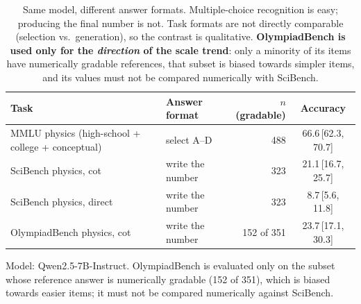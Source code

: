 \begin{table}[t]
  \centering
  \caption{Same model, different answer formats. Multiple-choice recognition is easy;
           producing the final number is not. Task formats are not directly comparable
           (selection vs.\ generation), so the contrast is qualitative. \textbf{OlympiadBench
           is used only for the \emph{direction} of the scale trend}: only a minority of its
           items have numerically gradable references, that subset is biased towards simpler
           items, and its values must not be compared numerically with SciBench.}
  \label{tab:cross-task}
  \small
  \begin{tabular}{@{}l l r c@{}}
    \toprule
    \textbf{Task} & \textbf{Answer format} & \textbf{$n$ (gradable)} & \textbf{Accuracy} \\
    \midrule
    MMLU physics (high-school + college + conceptual) & select A--D & 488 & 66.6\,[62.3, 70.7] \\
    SciBench physics, cot & write the number & 323 & 21.1\,[16.7, 25.7] \\
    SciBench physics, direct & write the number & 323 & 8.7\,[5.6, 11.8] \\
    OlympiadBench physics, cot & write the number & 152 of 351 & 23.7\,[17.1, 30.3] \\
    \bottomrule
  \end{tabular}
  \vspace{2pt}
  \parbox{\linewidth}{\footnotesize Model: Qwen2.5-7B-Instruct. OlympiadBench is
  evaluated only on the subset whose reference answer is numerically gradable
  (152 of 351), which is biased towards easier items; it must not be compared
  numerically against SciBench.}
\end{table}
